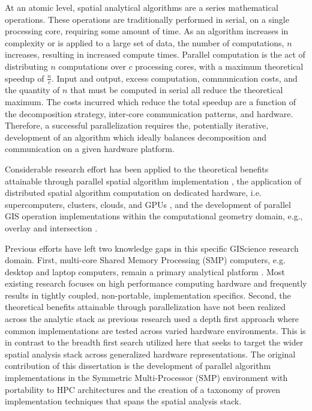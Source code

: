 At an atomic level, spatial analytical algorithms are a series mathematical operations.  These operations are traditionally performed in serial, on a single processing core, requiring some amount of time.  As an algorithm increases in complexity or is applied to a large set of data, the number of computations, $n$ increases, resulting in increased compute times.  Parallel computation is the act of distributing $n$ computations over $c$ processing cores, with a maximum theoretical speedup of $\frac{n}{c}$\citep{Grama:2003aa}.  Input and output, excess computation, communication costs, and the quantity of $n$ that must be computed in serial all reduce the theoretical maximum.  The costs incurred which reduce the total speedup are a function of the decomposition strategy, inter-core communication patterns, and hardware.  Therefore, a successful parallelization requires the, potentially iterative, development of an algorithm which ideally balances decomposition and communication on a given hardware platform.

Considerable research effort has been applied to the theoretical benefits attainable through parallel spatial algorithm implementation \citep{Armstrong1992, Clematis:2003aa, Wang2003, Yang2008, Yang2011}, the application of distributed spatial algorithm computation on dedicated hardware, i.e. supercomputers, clusters, clouds, and GPUs \citep{Armstrong1994, Armstrong1995, Armstrong1996, Puri:2014aa, Shook2013,  Xie:2010aa, Xia:2011aa, Widener:2012aa, Yang2009}, and the development of parallel GIS operation implementations within the computational geometry domain, e.g., overlay and intersection \citep{blelloch:1988, Healey1998, Puri:2014aa}.  

Previous efforts have left two knowledge gaps in this specific GIScience research domain.  First, multi-core Shared Memory Processing (SMP) computers, e.g. desktop and laptop computers, remain a primary analytical platform \citep{Goodchild1993, Unwin1996}.  Most existing research focuses on high performance computing hardware and frequently results in tightly coupled, non-portable, implementation specifics.  Second, the theoretical benefits attainable through parallelization have not been realized across the analytic stack as previous research used a depth first approach where common implementations are tested across varied hardware environments.
This is in contrast to the breadth first search utilized here that seeks to target the wider spatial analysis stack across generalized hardware representations.
The original contribution of this dissertation is the development of parallel algorithm implementations in the Symmetric Multi-Processor (SMP) environment with portability to HPC architectures and the creation of a taxonomy of proven implementation techniques that spans the spatial analysis stack.

